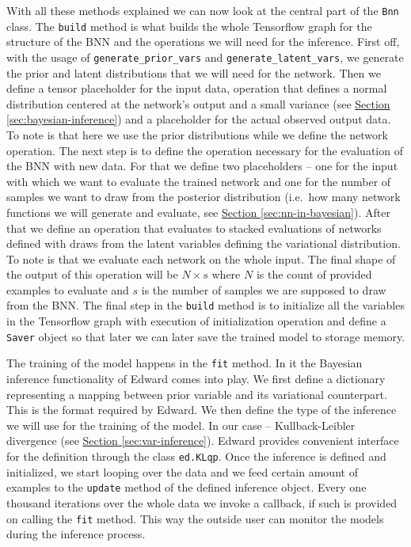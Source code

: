 \documentclass[12pt,a4paper,twoside]{scrartcl}
\numberwithin{equation}{section}
\newcommand{\refsec}[1]{\hyperref[#1]{Section \ref*{#1}}}
\begin{document}
With all these methods explained we can now look at the central part of the \texttt{Bnn} class. The \texttt{build} method is what builds the whole Tensorflow graph for the structure of the BNN and the operations we will need for the inference. First off, with the usage of \texttt{generate\_prior\_vars} and \texttt{generate\_latent\_vars}, we generate the prior and latent distributions that we will need for the network. Then we define a tensor placeholder for the input data, operation that defines a normal distribution centered at the network's output and a small variance (see \refsec{sec:bayesian-inference}) and a placeholder for the actual observed output data. To note is that here we use the prior distributions while we define the network operation. The next step is to define the operation necessary for the evaluation of the BNN with new data. For that we define two placeholders -- one for the input with which we want to evaluate the trained network and one for the number of samples we want to draw from the posterior distribution (i.e.\ how many network functions we will generate and evaluate, see \refsec{sec:nn-in-bayesian}). After that we define an operation that evaluates to stacked evaluations of networks defined with draws from the latent variables defining the variational distribution. To note is that we evaluate each network on the whole input. The final shape of the output of this operation will be \(N \times s\) where \(N\) is the count of provided examples to evaluate and \(s\) is the number of samples we are supposed to draw from the BNN. The final step in the \texttt{build} method is to initialize all the variables in the Tensorflow graph with execution of initialization operation and define a \texttt{Saver} object so that later we can later save the trained model to storage memory.

The training of the model happens in the \texttt{fit} method. In it the Bayesian inference functionality of Edward comes into play. We first define a dictionary representing a mapping between prior variable and its variational counterpart. This is the format required by Edward. We then define the type of the inference we will use for the training of the model. In our case -- Kullback-Leibler divergence (see \refsec{sec:var-inference}). Edward provides convenient interface for the definition through the class \texttt{ed.KLqp}. Once the inference is defined and initialized, we start looping over the data and we feed certain amount of examples to the \texttt{update} method of the defined inference object. Every one thousand iterations over the whole data we invoke a callback, if such is provided on calling the \texttt{fit} method. This way the outside user can monitor the models during the inference process.
\end{document}
